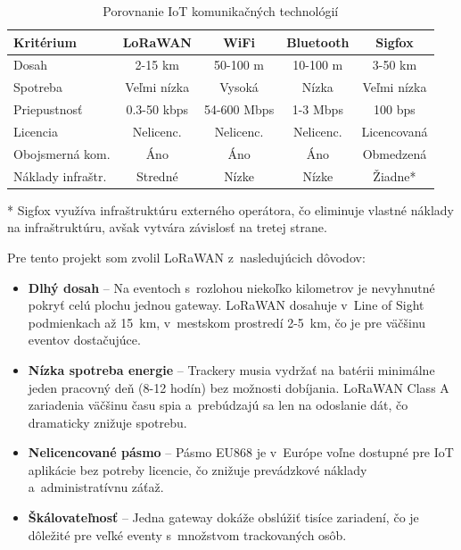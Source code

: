 \begin{table}[htbp]
    \centering
    \begin{tabular}{|l|c|c|c|c|}
        \hline
        \textbf{Kritérium} & \textbf{LoRaWAN} & \textbf{WiFi} & \textbf{Bluetooth} & \textbf{Sigfox} \\
        \hline
        Dosah & 2-15 km & 50-100 m & 10-100 m & 3-50 km \\
        Spotreba & Veľmi nízka & Vysoká & Nízka & Veľmi nízka \\
        Priepustnosť & 0.3-50 kbps & 54-600 Mbps & 1-3 Mbps & 100 bps \\
        Licencia & Nelicenc. & Nelicenc. & Nelicenc. & Licencovaná \\
        Obojsmerná kom. & Áno & Áno & Áno & Obmedzená \\
        Náklady infraštr. & Stredné & Nízke & Nízke & Žiadne* \\
        \hline
    \end{tabular}
    \caption{Porovnanie IoT komunikačných technológií}
    \label{tab:iot-comparison}
    \smallskip
    \begin{minipage}{\linewidth}
        \small{* Sigfox využíva infraštruktúru externého operátora, čo eliminuje vlastné náklady na infraštruktúru, avšak vytvára závislosť na tretej strane.}
    \end{minipage}
\end{table}

Pre tento projekt som zvolil LoRaWAN z~nasledujúcich dôvodov:

\begin{itemize}
    \item \textbf{Dlhý dosah} -- Na eventoch s~rozlohou niekoľko kilometrov je nevyhnutné pokryť celú plochu jednou gateway. LoRaWAN dosahuje v~Line of Sight podmienkach až 15~km, v~mestskom prostredí 2-5~km, čo je pre väčšinu eventov dostačujúce.

    \item \textbf{Nízka spotreba energie} -- Trackery musia vydržať na batérii minimálne jeden pracovný deň (8-12 hodín) bez možnosti dobíjania. LoRaWAN Class A zariadenia väčšinu času spia a~prebúdzajú sa len na odoslanie dát, čo dramaticky znižuje spotrebu.

    \item \textbf{Nelicencované pásmo} -- Pásmo EU868 je v~Európe voľne dostupné pre IoT aplikácie bez potreby licencie, čo znižuje prevádzkové náklady a~administratívnu záťaž.

    \item \textbf{Škálovateľnosť} -- Jedna gateway dokáže obslúžiť tisíce zariadení, čo je dôležité pre veľké eventy s~množstvom trackovaných osôb.
\end{itemize}


